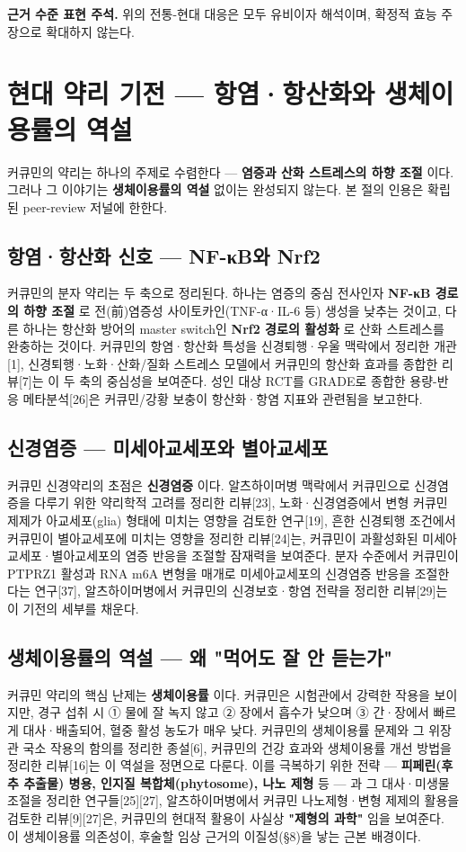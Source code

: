\documentclass[11pt,oneside]{book}
\newenvironment{authnote}
  {\par\smallskip\begingroup\leftskip=7mm\rightskip=5mm\small\color{muted}\noindent\ignorespaces}
  {\par\endgroup\smallskip}
\begin{document}
\begin{authnote}\textbf{근거 수준 표현 주석.} 위의 전통-현대 대응은 모두 유비이자 해석이며, 확정적 효능 주장으로 확대하지 않는다.\end{authnote}
\section{현대 약리 기전 — 항염·항산화와 생체이용률의 역설}
커큐민의 약리는 하나의 주제로 수렴한다 — \textbf{염증과 산화 스트레스의 하향 조절} 이다. 그러나 그 이야기는 \textbf{생체이용률의 역설} 없이는 완성되지 않는다. 본 절의 인용은 확립된 peer-review 저널에 한한다.

\subsection{항염·항산화 신호 — NF-κB와 Nrf2}
커큐민의 분자 약리는 두 축으로 정리된다. 하나는 염증의 중심 전사인자 \textbf{NF-κB 경로의 하향 조절} 로 전(前)염증성 사이토카인(TNF-α·IL-6 등) 생성을 낮추는 것이고, 다른 하나는 항산화 방어의 master switch인 \textbf{Nrf2 경로의 활성화} 로 산화 스트레스를 완충하는 것이다. 커큐민의 항염·항산화 특성을 신경퇴행·우울 맥락에서 정리한 개관[1], 신경퇴행·노화·산화/질화 스트레스 모델에서 커큐민의 항산화 효과를 종합한 리뷰[7]는 이 두 축의 중심성을 보여준다. 성인 대상 RCT를 GRADE로 종합한 용량-반응 메타분석[26]은 커큐민/강황 보충이 항산화·항염 지표와 관련됨을 보고한다.

\subsection{신경염증 — 미세아교세포와 별아교세포}
커큐민 신경약리의 초점은 \textbf{신경염증} 이다. 알츠하이머병 맥락에서 커큐민으로 신경염증을 다루기 위한 약리학적 고려를 정리한 리뷰[23], 노화·신경염증에서 변형 커큐민 제제가 아교세포(glia) 형태에 미치는 영향을 검토한 연구[19], 흔한 신경퇴행 조건에서 커큐민이 별아교세포에 미치는 영향을 정리한 리뷰[24]는, 커큐민이 과활성화된 미세아교세포·별아교세포의 염증 반응을 조절할 잠재력을 보여준다. 분자 수준에서 커큐민이 PTPRZ1 활성과 RNA m6A 변형을 매개로 미세아교세포의 신경염증 반응을 조절한다는 연구[37], 알츠하이머병에서 커큐민의 신경보호·항염 전략을 정리한 리뷰[29]는 이 기전의 세부를 채운다.

\subsection{생체이용률의 역설 — 왜 "먹어도 잘 안 듣는가"}
커큐민 약리의 핵심 난제는 \textbf{생체이용률} 이다. 커큐민은 시험관에서 강력한 작용을 보이지만, 경구 섭취 시 ① 물에 잘 녹지 않고 ② 장에서 흡수가 낮으며 ③ 간·장에서 빠르게 대사·배출되어, 혈중 활성 농도가 매우 낮다. 커큐민의 생체이용률 문제와 그 위장관 국소 작용의 함의를 정리한 종설[6], 커큐민의 건강 효과와 생체이용률 개선 방법을 정리한 리뷰[16]는 이 역설을 정면으로 다룬다. 이를 극복하기 위한 전략 — \textbf{피페린(후추 추출물) 병용, 인지질 복합체(phytosome), 나노 제형} 등 — 과 그 대사·미생물 조절을 정리한 연구들[25][27], 알츠하이머병에서 커큐민 나노제형·변형 제제의 활용을 검토한 리뷰[9][27]은, 커큐민의 현대적 활용이 사실상 \textbf{"제형의 과학"} 임을 보여준다. 이 생체이용률 의존성이, 후술할 임상 근거의 이질성(§8)을 낳는 근본 배경이다.
\end{document}

